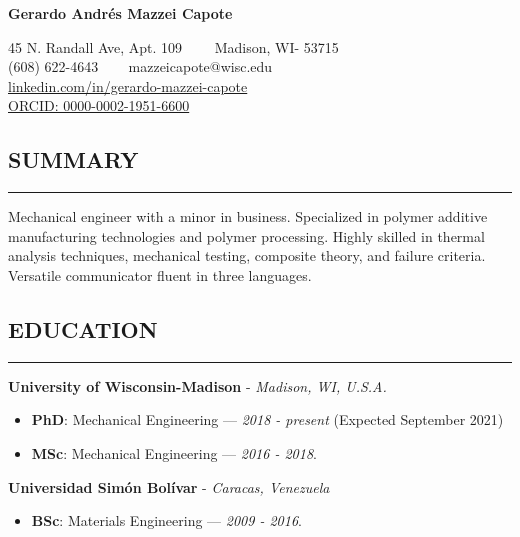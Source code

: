 \documentclass[11pt,letterpaper]{article}
\newenvironment{indentsection}[1]%
{\begin{list}{}%
	{\setlength{\leftmargin}{#1}}%
	\item[]%
}
{\end{list}}
\begin{document}
	\thispagestyle{firststyle}

	
\begin{center}
	{\LARGE \textbf{Gerardo Andrés Mazzei Capote}}

	45 N. Randall Ave, Apt. 109\ \ \textbullet
	\ \ Madison, WI- 53715
	\\
	(608) 622-4643 \ \textbullet
	\ \ mazzeicapote@wisc.edu\\
	\href{https://www.linkedin.com/in/gerardo-mazzei-capote}{linkedin.com/in/gerardo-mazzei-capote}\\
	\href{https://orcid.org/0000-0002-1951-6600}{ORCID: 0000-0002-1951-6600}
	
\end{center}

\vspace{-1em}

\subsection*{SUMMARY}
	\vspace{-0.5em}
	\hrule
	\vspace{0.4em}
	\begin{indentsection}{\parindent}
	Mechanical engineer with a minor in business. Specialized in polymer additive manufacturing technologies and polymer processing. Highly skilled in thermal analysis techniques, mechanical testing, composite theory, and failure criteria. Versatile communicator fluent in three languages.
	\end{indentsection}


\subsection*{EDUCATION}
	\vspace{-0.5em}
	\hrule
	\vspace{0.4em}
	\textbf{University of Wisconsin-Madison} - \emph{Madison, WI, U.S.A.}
	\begin{itemize}	
	\item
	\textbf{PhD}: Mechanical Engineering --- \emph{2018 - present} (Expected September 2021) 
	\item
	\textbf{MSc}: Mechanical Engineering --- \emph{2016 - 2018}. 
	\end{itemize}

	\noindent \textbf{Universidad Simón Bolívar} - \emph{Caracas, Venezuela}
	\begin{itemize}	
	\item
	\textbf{BSc}: Materials Engineering --- \emph{2009 - 2016}. 
	\end{itemize}
\end{document}
